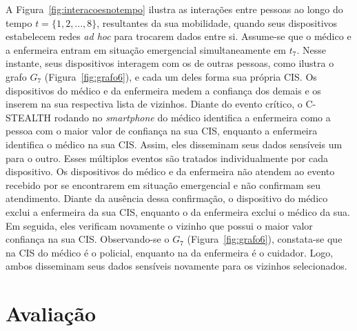 \documentclass[12pt]{article}
\begin{document}
A Figura~\ref{fig:interacoesnotempo} ilustra as interações entre pessoas ao longo do tempo $t = \{1,2,...,8\}$, resultantes da sua mobilidade, quando seus dispositivos estabelecem redes \textit{ad hoc} para trocarem dados entre si. Assume-se que o médico e a enfermeira entram em situação emergencial simultaneamente em $t_7$. Nesse instante, seus dispositivos interagem com os de outras pessoas, como ilustra o grafo $G_7$ (Figura~\ref{fig:grafo6}), e cada um deles forma sua própria
CIS. Os dispositivos do médico e da enfermeira medem a confiança dos demais e os inserem na sua respectiva lista de vizinhos. Diante do evento crítico, o \mbox{C-STEALTH} rodando no \textit{smartphone} do médico identifica a enfermeira como a pessoa com o maior valor de confiança na sua
CIS, enquanto a enfermeira identifica o médico na sua
CIS. Assim, eles disseminam seus dados sensíveis um para o outro. Esses múltiplos eventos são tratados individualmente por cada dispositivo. Os dispositivos do médico e da enfermeira não atendem ao evento recebido por se encontrarem em situação emergencial e não confirmam seu atendimento. Diante da ausência dessa confirmação, o dispositivo do médico exclui a enfermeira da sua CIS,
enquanto o da enfermeira exclui o médico da sua.
Em seguida, eles verificam novamente o vizinho que possui o maior valor confiança na sua 
CIS. Observando-se o $G_7$ (Figura~\ref{fig:grafo6}), constata-se que na
CIS do médico é o policial, enquanto na da enfermeira é o cuidador. Logo, ambos disseminam seus dados sensíveis novamente para os vizinhos selecionados.

\section{Avaliação}
\label{sec:aval}
\end{document}
